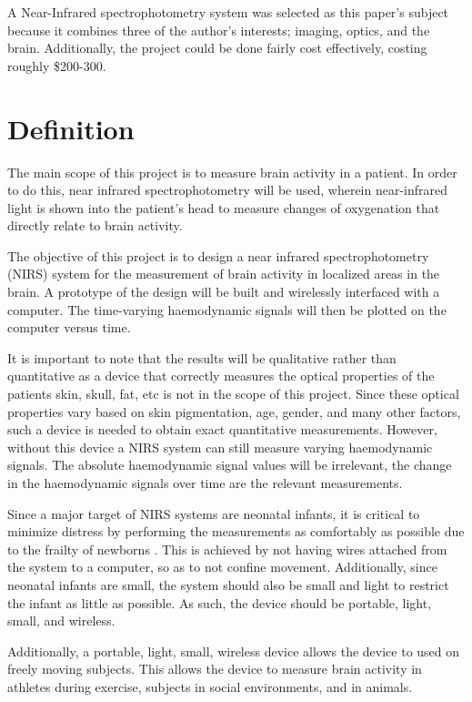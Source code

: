 A Near-Infrared spectrophotometry system was selected as this paper's subject because it combines three of the author's interests; imaging, optics, and the brain. Additionally, the project could be done fairly cost effectively, costing roughly \$200-300.

\section{Definition}
The main scope of this project is to measure brain activity in a patient. In order to do this, near infrared spectrophotometry will be used, wherein near-infrared light is shown into the patient's head to measure changes of oxygenation that directly relate to brain activity.

The objective of this project is to design a near infrared spectrophotometry (NIRS) system for the measurement of brain activity in localized areas in the brain. A prototype of the design will be built and wirelessly interfaced with a computer. The time-varying haemodynamic signals will then be plotted on the computer versus time. 

It is important to note that the results will be qualitative rather than quantitative as a device that correctly measures the optical properties of the patients skin, skull, fat, etc is not in the scope of this project. Since these optical properties vary based on skin pigmentation, age, gender, and many other factors, such a device is needed to obtain exact quantitative measurements. However, without this device a NIRS system can still measure varying haemodynamic signals. The absolute haemodynamic signal values will be irrelevant, the change in the haemodynamic signals over time are the relevant measurements. 

Since a major target of NIRS systems are neonatal infants, it is critical to minimize distress by performing the measurements as comfortably as possible due to the frailty of newborns \cite{mini08}. This is achieved by not having wires attached from the system to a computer, so as to not confine movement. Additionally, since neonatal infants are small, the system should also be small and light to restrict the infant as little as possible. As such, the device should be portable, light, small, and wireless. 

Additionally, a portable, light, small, wireless device allows the device to used on freely moving subjects. This allows the device to measure brain activity in athletes during exercise, subjects in social environments, and in animals.  

